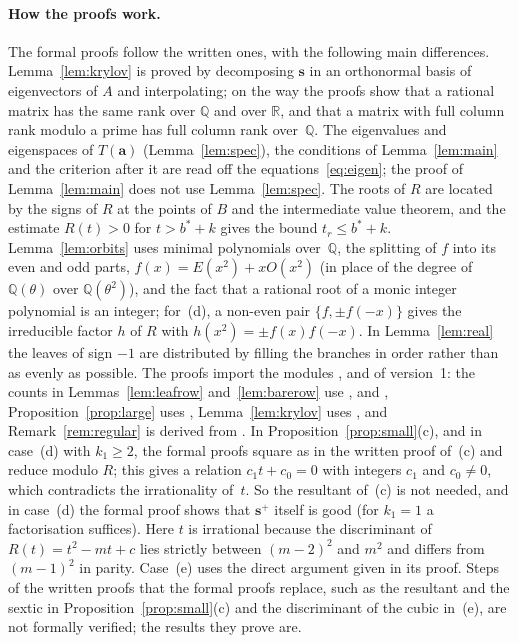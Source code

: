 \documentclass[11pt]{article}
\numberwithin{equation}{section}
\theoremstyle{remark}
\newcommand{\Q}{\mathbb Q}
\newcommand{\R}{\mathbb R}
\newcommand{\s}{\mathbf s}
\newcommand{\bfa}{\mathbf a}
\begin{document}
\paragraph{How the proofs work.}
The formal proofs follow the written ones, with the following main
differences. Lemma~\ref{lem:krylov} is proved by decomposing $\s$ in an
orthonormal basis of eigenvectors of $A$ and interpolating; on the way the
proofs show that a rational matrix has the same rank over $\Q$ and over $\R$,
and that a matrix with full column rank modulo a prime has full column rank
over~$\Q$. The eigenvalues and eigenspaces of $T(\bfa)$
(Lemma~\ref{lem:spec}), the conditions of Lemma~\ref{lem:main} and the
criterion after it are read off the equations~\eqref{eq:eigen}; the proof of
Lemma~\ref{lem:main} does not use Lemma~\ref{lem:spec}. The roots of $R$ are
located by the signs of $R$ at the points of $B$ and the intermediate value
theorem, and the estimate $R(t)>0$ for $t>b^*+k$ gives the bound
$t_r\le b^*+k$. Lemma~\ref{lem:orbits} uses minimal polynomials over~$\Q$, the
splitting of $f$ into its even and odd parts, $f(x)=E(x^2)+xO(x^2)$ (in place
of the degree of $\Q(\theta)$ over $\Q(\theta^2)$), and the fact that a
rational root of a monic integer polynomial is an integer; for~(d), a non-even
pair $\{f,\pm f(-x)\}$ gives the irreducible factor $h$ of $R$ with
$h(x^2)=\pm f(x)f(-x)$. In Lemma~\ref{lem:real} the leaves of sign $-1$ are
distributed by filling the branches in order rather than as evenly as
possible. The proofs import the modules ,
 and  of version~1: the
counts in Lemmas~\ref{lem:leafrow} and~\ref{lem:barerow} use
,  and
, Proposition~\ref{prop:large} uses ,
Lemma~\ref{lem:krylov} uses , and
Remark~\ref{rem:regular} is derived from . In
Proposition~\ref{prop:small}(c), and in case~(d) with $k_1\ge2$, the formal
proofs square as in the written proof of~(c) and reduce modulo $R$; this gives
a relation $c_1t+c_0=0$ with integers $c_1$ and $c_0\ne0$, which contradicts
the irrationality of~$t$. So the resultant of~(c) is not needed, and in
case~(d) the formal proof shows that $\s^+$ itself is good (for $k_1=1$ a
factorisation suffices). Here $t$ is irrational because the discriminant of $R(t)=t^2-mt+c$ lies strictly
between $(m-2)^2$ and $m^2$ and differs from $(m-1)^2$ in parity. Case~(e) uses
the direct argument given in its proof. Steps of the written proofs that the
formal proofs replace, such as the resultant and the sextic in
Proposition~\ref{prop:small}(c) and the discriminant of the cubic in~(e), are
not formally verified; the results they prove are.
\end{document}
